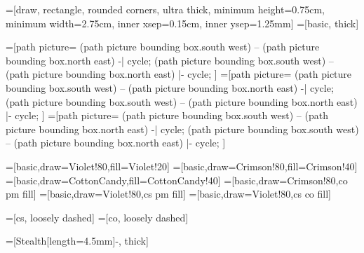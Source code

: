 \documentclass[12pt]{article}
\begin{document}
=[draw, rectangle, rounded corners, ultra thick, minimum height=0.75cm, minimum width=2.75cm, inner xsep=0.15cm, inner ysep=1.25mm]
=[basic, thick]

\newcommand\HalfFill[2] {
    \fill[#1] (path picture bounding box.south west)
    -- (path picture bounding box.north east) -| cycle;
    \fill[#2] (path picture bounding box.south west)
    -- (path picture bounding box.north east) |- cycle;
}

=[path picture={\HalfFill{Crimson!40}{CottonCandy!40}}]
=[path picture={\HalfFill{Violet!20}{CottonCandy!40}}]
=[path picture={\HalfFill{Violet!20}{Crimson!40}}]

=[basic,draw=Violet!80,fill=Violet!20]
=[basic,draw=Crimson!80,fill=Crimson!40]
=[basic,draw=CottonCandy,fill=CottonCandy!40]
=[basic,draw=Crimson!80,co pm fill]
=[basic,draw=Violet!80,cs pm fill]
=[basic,draw=Violet!80,cs co fill]

=[cs, loosely dashed]
=[co, loosely dashed]

=[{Stealth[length=4.5mm]}-, thick]

\newcommand\DrawCourses[2][3 cm] {
    \foreach \title/\style in {#2} {
        \node (\title) [\style, right=#1 of last, alias=last] {\title};
    }
}

\newcommand\PlaceCourses[1] {
    \foreach \title/\style/\dist in {#1} {
        \node (\title) [\style, right=\dist of last, alias=last] {\title};
    }
}

\newcommand\PutCourses[1] {
    \foreach \title/\style/\place/\dist in {#1} {
        \node (\title) [\style, \place=\dist, alias=last] {\title};
    }
}
\end{document}
